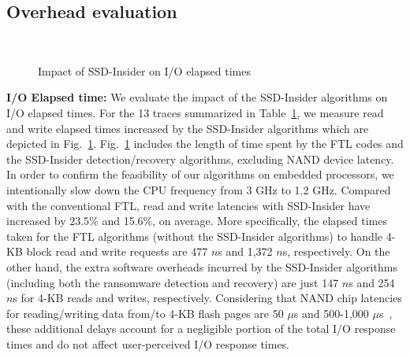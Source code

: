 \documentclass[conference]{IEEEtran}
\newcommand{\ours}{SSD-Insider}
\begin{document}
\subsection{Overhead evaluation}\label{sec:oeval}
\begin{figure}[b!]
	\centering 
	 \\
	\caption{Impact of \ours{} on I/O elapsed times}
	\label{fig:flash-avg-resp}
\end{figure}
{\noindent\bf I/O Elapsed time:} 
We evaluate the impact of the \ours{} algorithms on I/O elapsed times.  For the
13 traces summarized in Table~\ref{fig:flash-avg-resp}, we measure read and
write elapsed times increased by the \ours{} algorithms which are depicted in
Fig.~\ref{fig:flash-avg-resp}.  Fig.~\ref{fig:flash-avg-resp} includes the
length of time spent by the FTL codes and the \ours{} detection/recovery
algorithms, excluding NAND device latency.  In order to confirm the feasibility
of our algorithms on embedded processors, we intentionally slow down the CPU
frequency from 3 GHz to 1.2 GHz.  Compared with the conventional FTL, read and
write latencies with \ours{} have increased by 23.5\% and 15.6\%, on average.
More specifically, the elapsed times taken for the FTL algorithms (without the
\ours{} algorithms) to handle 4-KB block read and write requests are 477 $n$s
and 1,372 $n$s, respectively. On the other hand, the extra software overheads
incurred by the \ours{} algorithms (including both the ransomware detection and
recovery) are just 147 $n$s and 254 $n$s for 4-KB reads and writes,
respectively. Considering that NAND chip latencies for reading/writing data
from/to 4-KB flash pages are 50 $\mu$s and 500-1,000 $\mu$s~\cite{micron-nand},
these additional delays account for a negligible portion of the total I/O
response times and do not affect user-perceived I/O response times.
\end{document}

